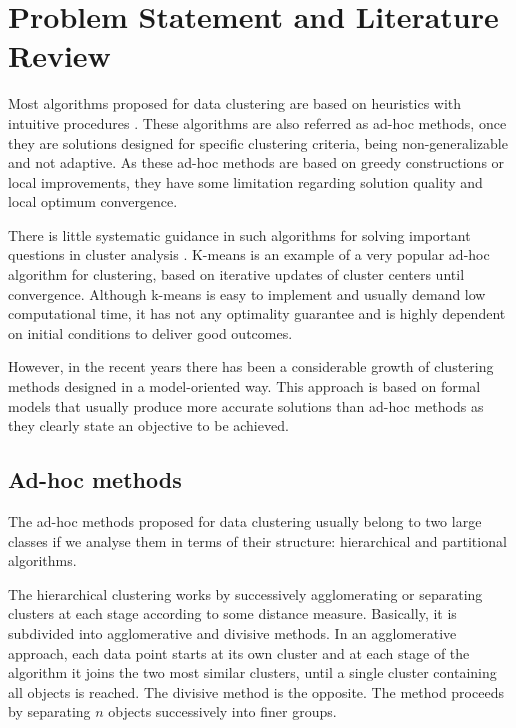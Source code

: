 \chapter{Problem Statement and Literature Review}

Most algorithms proposed for data clustering are based on heuristics with intuitive procedures \cite{Fraley2002}. These algorithms are also referred as ad-hoc methods, once they are solutions designed for specific clustering criteria, being non-generalizable and not adaptive. As these ad-hoc methods are based on greedy constructions or local improvements, they have some limitation regarding solution quality and local optimum convergence.

There is little systematic guidance in such algorithms for solving important questions in cluster analysis \cite{Fraley2002}. K-means is an example of a very popular ad-hoc algorithm for clustering, based on iterative updates of cluster centers until convergence. Although k-means is easy to implement and usually demand low computational time, it has not any optimality guarantee and is highly dependent on initial conditions to deliver good outcomes.

However, in the recent years there has been a considerable growth of clustering methods designed in a model-oriented way. This approach is based on formal models that usually produce more accurate solutions than ad-hoc methods as they clearly state an objective to be achieved.

\section{Ad-hoc methods}
The ad-hoc methods proposed for data clustering usually belong to two large classes if we analyse them in terms of their structure: hierarchical and partitional algorithms.

The hierarchical clustering works by successively agglomerating or separating clusters at each stage according to some distance measure. Basically, it is subdivided into agglomerative and divisive methods. In an agglomerative approach, each data point starts at its own cluster and at each stage of the algorithm it joins the two most similar clusters, until a single cluster containing all objects is reached. The divisive method is the opposite. The method proceeds by separating $n$ objects successively into finer groups. 

